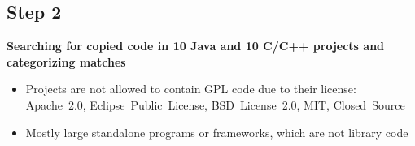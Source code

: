 \subsection{Step 2}
\begin{frame}{\insertsubsection}
	\textbf{Searching for copied code in 10 Java and 10 C/C++ projects and categorizing matches}
	
	\begin{itemize}
		\item Projects are not allowed to contain GPL code due to their license: Apache~2.0, Eclipse~Public~License, BSD~License~2.0, MIT, Closed~Source
		\item Mostly large standalone programs or frameworks, which are not library code
	\end{itemize}

\end{frame}

